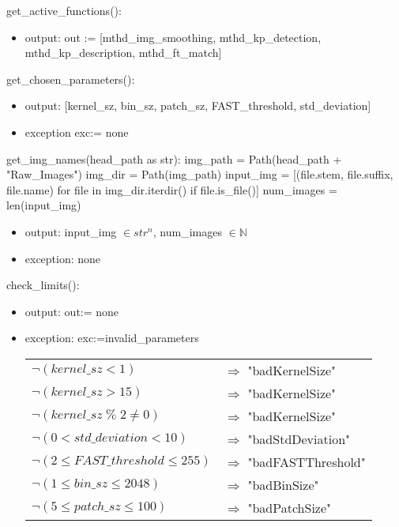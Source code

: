 \documentclass[12pt, titlepage]{article}
\begin{document}
\noindent get\_active\_functions():
\begin{itemize}
  \item output: out := [mthd\_img\_smoothing, mthd\_kp\_detection, 
  mthd\_kp\_description, mthd\_ft\_match] 
\end{itemize}


\noindent get\_chosen\_parameters():
\begin{itemize}
  \item output: [kernel\_sz, bin\_sz, patch\_sz, FAST\_threshold,  
  std\_deviation]
  \item exception exc:= none
\end{itemize}


\noindent get\_img\_names(head\_path as str): \newline \newline
img\_path = Path(head\_path + "Raw\_Images") \newline
img\_dir = Path(img\_path) \newline
input\_img = [(file.stem, file.suffix, file.name) 
for file in img\_dir.iterdir() if file.is\_file()] \newline
num\_images = len(input\_img)
\begin{itemize}
\item output: input\_img $\in str^{n}$, num\_images $\in \mathbb{N}$
\item exception: none 
\end{itemize}


\noindent check\_limits():
\begin{itemize}
  \item output: out:= none
  \item exception: exc:=invalid\_parameters\
  \noindent \begin{longtable*}[l]{l l} 
    $\neg (kernel\_sz < 1)$ & $\Rightarrow$ "badKernelSize"\\
    $\neg (kernel\_sz > 15)$ & $\Rightarrow$ "badKernelSize"\\
    $\neg (kernel\_sz \; \% \; 2 \neq 0)$ & $\Rightarrow$ "badKernelSize"\\
    $\neg (0 < std\_deviation < 10)$ & $\Rightarrow$ "badStdDeviation"\\
    $\neg (2 \leq FAST\_threshold \leq 255)$ & $\Rightarrow$ "badFASTThreshold"\\
    $\neg (1 \leq bin\_sz \leq 2048)$ & $\Rightarrow$ "badBinSize"\\
    $\neg (5 \leq patch\_sz \leq 100)$ & $\Rightarrow$ "badPatchSize"\\
    \end{longtable*}
\end{itemize}
\end{document}
